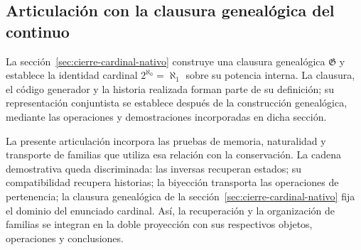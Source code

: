 \subsection{Articulación con la clausura genealógica del continuo}
La sección~\ref{sec:cierre-cardinal-nativo} construye una clausura
genealógica \(\mathfrak G\) y establece la identidad cardinal
\(2^{\aleph_0}=\aleph_1\) sobre su potencia interna. La clausura,
el código generador y la historia realizada forman parte de su
definición; su representación conjuntista se establece después de la
construcción genealógica, mediante las operaciones y demostraciones
incorporadas en dicha sección.

La presente articulación incorpora las pruebas de memoria,
naturalidad y transporte de familias que utiliza esa relación con
la conservación. La cadena demostrativa queda discriminada:
las inversas recuperan estados; su compatibilidad recupera
historias; la biyección transporta las operaciones de pertenencia;
la clausura genealógica de la sección~\ref{sec:cierre-cardinal-nativo} fija el dominio
del enunciado cardinal. Así, la recuperación y la organización
de familias se integran en la doble proyección con sus respectivos
objetos, operaciones y conclusiones.
